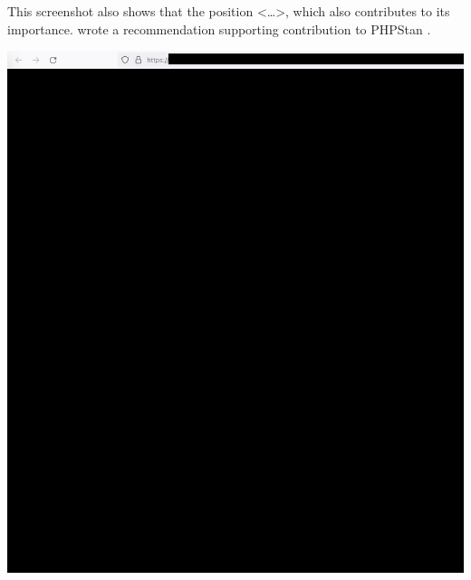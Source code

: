 
This screenshot also shows that the position <\dots>,
which also contributes to its importance.
\MrPhpTwo wrote a recommendation supporting \mrls contribution to PHPStan .

\begin{center}
    \includegraphics[width=36em]{php-two-company-role_public}
\end{center}

\pagebreak
